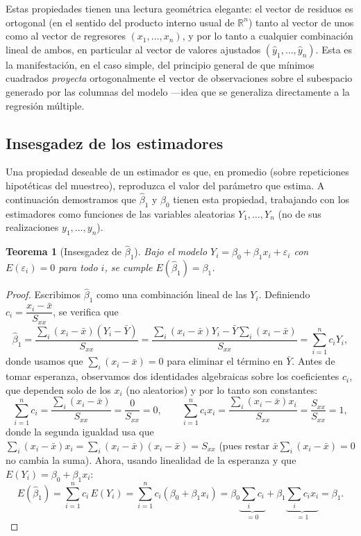 \documentclass[11pt,a4paper]{article}
\theoremstyle{plain}
\newtheorem{teorema}{Teorema}[section]
\theoremstyle{definition}
\theoremstyle{remark}
\begin{document}
Estas propiedades tienen una lectura geométrica elegante: el vector de residuos es ortogonal (en el sentido del producto interno usual de $\mathbb{R}^n$) tanto al vector de unos como al vector de regresores $(x_1,\dots,x_n)$, y por lo tanto a cualquier combinación lineal de ambos, en particular al vector de valores ajustados $(\hat y_1,\dots,\hat y_n)$. Esta es la manifestación, en el caso simple, del principio general de que mínimos cuadrados \emph{proyecta} ortogonalmente el vector de observaciones sobre el subespacio generado por las columnas del modelo —idea que se generaliza directamente a la regresión múltiple.

\subsection{Insesgadez de los estimadores}

Una propiedad deseable de un estimador es que, en promedio (sobre repeticiones hipotéticas del muestreo), reproduzca el valor del parámetro que estima. A continuación demostramos que $\hat\beta_1$ y $\hat\beta_0$ tienen esta propiedad, trabajando con los estimadores como funciones de las variables aleatorias $Y_1,\dots,Y_n$ (no de sus realizaciones $y_1,\dots,y_n$).

\begin{teorema}[Insesgadez de $\hat\beta_1$]
Bajo el modelo $Y_i=\beta_0+\beta_1x_i+\varepsilon_i$ con $E(\varepsilon_i)=0$ para todo $i$, se cumple $E(\hat\beta_1)=\beta_1$.
\end{teorema}

\begin{proof}
Escribimos $\hat\beta_1$ como una combinación lineal de las $Y_i$. Definiendo $c_i = \dfrac{x_i-\bar x}{S_{xx}}$, se verifica que
\[
\hat\beta_1 = \frac{\sum_i (x_i-\bar x)(Y_i-\bar Y)}{S_{xx}} = \frac{\sum_i (x_i-\bar x)Y_i - \bar Y\sum_i(x_i-\bar x)}{S_{xx}} = \sum_{i=1}^n c_i Y_i,
\]
donde usamos que $\sum_i(x_i-\bar x)=0$ para eliminar el término en $\bar Y$. Antes de tomar esperanza, observamos dos identidades algebraicas sobre los coeficientes $c_i$, que dependen solo de los $x_i$ (no aleatorios) y por lo tanto son constantes:
\[
\sum_{i=1}^n c_i = \frac{\sum_i (x_i-\bar x)}{S_{xx}} = \frac{0}{S_{xx}} = 0, \qquad \sum_{i=1}^n c_i x_i = \frac{\sum_i (x_i-\bar x)x_i}{S_{xx}} = \frac{S_{xx}}{S_{xx}} = 1,
\]
donde la segunda igualdad usa que $\sum_i(x_i-\bar x)x_i = \sum_i(x_i-\bar x)(x_i-\bar x) = S_{xx}$ (pues restar $\bar x\sum_i(x_i-\bar x)=0$ no cambia la suma). Ahora, usando linealidad de la esperanza y que $E(Y_i)=\beta_0+\beta_1x_i$:
\[
E(\hat\beta_1) = \sum_{i=1}^n c_i\,E(Y_i) = \sum_{i=1}^n c_i(\beta_0+\beta_1x_i) = \beta_0\underbrace{\sum_i c_i}_{=0} + \beta_1\underbrace{\sum_i c_ix_i}_{=1} = \beta_1.
\]
\end{proof}
\end{document}
